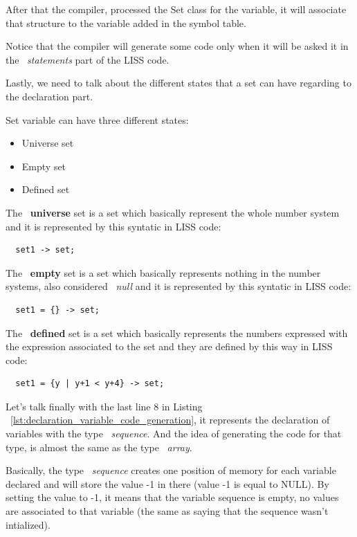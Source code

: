 \documentclass[
  oneside,
  11pt, a4paper,
  footinclude=true,
  headinclude=true,
  cleardoublepage=empty
]{scrbook}
\begin{document}
After that the compiler, processed the Set class for the variable, it will associate that structure to the variable added in the symbol table.

Notice that the compiler will generate some code only when it will be asked it in the ~\textit{statements} part of the LISS code.

Lastly, we need to talk about the different states that a set can have regarding to the declaration part.

Set variable can have three different states:

\begin{itemize}
\item Universe set
\item Empty set
\item Defined set
\end{itemize}

The ~\textbf{universe} set is a set which basically represent the whole number system and it is represented by this syntatic in LISS code:

\begin{lstlisting}
  set1 -> set;
\end{lstlisting}

The ~\textbf{empty} set is a set which basically represents nothing in the number systems, also considered ~\textit{null} and it is represented by this syntatic in LISS code:

\begin{lstlisting}
  set1 = {} -> set;
\end{lstlisting}

The ~\textbf{defined} set is a set which basically represents the numbers expressed with the expression associated to the set and they are defined by this way in LISS code:

\begin{lstlisting}
  set1 = {y | y+1 < y+4} -> set;
\end{lstlisting}

Let's talk finally with the last line 8 in Listing ~\ref{lst:declaration_variable_code_generation}, it represents the declaration of variables with the type ~\textit{sequence}. And the idea of generating the code for that type, is almost the same as the type ~\textit{array}.

Basically, the type ~\textit{sequence} creates one position of memory for each variable declared and will store the value -1 in there (value -1 is equal to NULL). By setting the value to -1, it means that the variable sequence is empty, no values are associated to that variable (the same as saying that the sequence wasn't intialized).
\end{document}
